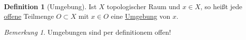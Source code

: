 \documentclass[a4paper,11pt,notitlepage]{report}
\theoremstyle{remark}
\newtheorem{remark}{Bemerkung}[chapter]
\theoremstyle{definition}
\newtheorem{definition}{Definition}[chapter]
\begin{document}
\begin{definition}[Umgebung]
	Ist $X$ topologischer Raum und $x \in X$, so heißt jede \underline{offene} Teilmenge $O \subset X$ mit $x \in O$ eine \underline{Umgebung} von $x$.
\end{definition}

\begin{remark}
	Umgebungen sind per definitionem offen! \newline
	\begin{figure}[h]
		\centering
		 $\qquad\qquad$ 				 
	\end{figure}
\end{remark}
\end{document}
